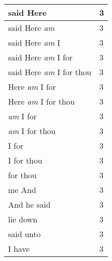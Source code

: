 \begin{center}
\begin{longtable}{|p{3.0in}|p{0.5in}|}
said Here & 3\\ \hline 
said Here \emph{am} & 3\\ \hline 
said Here \emph{am} I & 3\\ \hline 
said Here \emph{am} I for & 3\\ \hline 
said Here \emph{am} I for thou & 3\\ \hline 
Here \emph{am} I for & 3\\ \hline 
Here \emph{am} I for thou & 3\\ \hline 
\emph{am} I for & 3\\ \hline 
\emph{am} I for thou & 3\\ \hline 
I for & 3\\ \hline 
I for thou & 3\\ \hline 
for thou & 3\\ \hline 
me And & 3\\ \hline 
And he said & 3\\ \hline 
lie down & 3\\ \hline 
said unto & 3\\ \hline 
I have & 3\\ \hline 
\end{longtable}
\end{center}





